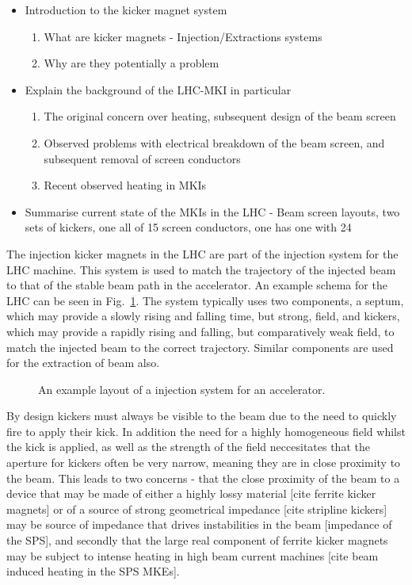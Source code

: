 
\begin{itemize}
\item{Introduction to the kicker magnet system}
\begin{enumerate}
\item{What are kicker magnets - Injection/Extractions systems}
\item{Why are they potentially a problem}
\end{enumerate}
\item{Explain the background of the LHC-MKI in particular}
\begin{enumerate}
\item{The original concern over heating, subsequent design of the beam screen}
\item{Observed problems with electrical breakdown of the beam screen, and subsequent removal of screen conductors}
\item{Recent observed heating in MKIs}
\end{enumerate}
\item{Summarise current state of the MKIs in the LHC - Beam screen layouts, two sets of kickers, one all of 15 screen conductors, one has one with 24}
\end{itemize}

The injection kicker magnets in the LHC are part of the injection system for the LHC machine. This system is used to match the trajectory of the injected beam to that of the stable beam path in the accelerator. An example schema for the LHC can be seen in Fig.~\ref{fig:injection-system-schema}. The system typically uses two components, a septum, which may provide a slowly rising and falling time, but strong, field, and kickers, which may provide a rapidly rising and falling, but comparatively weak field, to match the injected beam to the correct trajectory. Similar components are used for the extraction of beam also.

\begin{figure}

\label{fig:injection-system-schema}
\caption{An example layout of a injection system for an accelerator.}
\end{figure}

By design kickers must always be visible to the beam due to the need to quickly fire to apply their kick. In addition the need for a highly homogeneous field whilst the kick is applied, as well as the strength of the field neccesitates that the aperture for kickers often be very narrow, meaning they are in close proximity to the beam. This leads to two concerns - that the close proximity of the beam to a device that may be made of either a highly lossy material [cite ferrite kicker magnets] or of a source of strong geometrical impedance [cite stripline kickers] may be source of impedance that drives instabilities in the beam [impedance of the SPS], and secondly that the large real component of ferrite kicker magnets may be subject to intense heating in high beam current machines [cite beam induced heating in the SPS MKEs]. 

